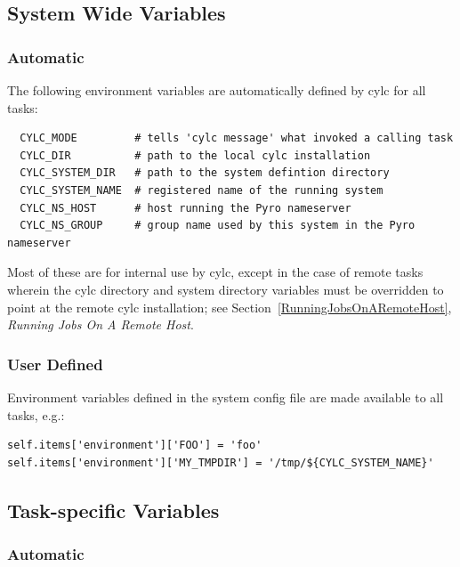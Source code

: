 \documentclass[11pt,a4paper]{article}
\begin{document}
\subsection{System Wide Variables}
\lstset{language=bash}

\subsubsection{Automatic}
The following environment variables are automatically defined by cylc
for all tasks:

\begin{lstlisting}
  CYLC_MODE         # tells 'cylc message' what invoked a calling task
  CYLC_DIR          # path to the local cylc installation
  CYLC_SYSTEM_DIR   # path to the system defintion directory
  CYLC_SYSTEM_NAME  # registered name of the running system 
  CYLC_NS_HOST      # host running the Pyro nameserver
  CYLC_NS_GROUP     # group name used by this system in the Pyro nameserver
\end{lstlisting}

Most of these are for internal use by cylc, except in the case of remote
tasks wherein the cylc directory and system directory variables must be
overridden to point at the remote cylc installation; see
Section~\ref{RunningJobsOnARemoteHost}, {\em Running
Jobs On A Remote Host}. 

\subsubsection{User Defined}
\label{SystemWideVariables}

Environment variables defined in the system config file are made
available to all tasks, e.g.: 

\lstset{language=Python}

\begin{lstlisting}
self.items['environment']['FOO'] = 'foo'
self.items['environment']['MY_TMPDIR'] = '/tmp/${CYLC_SYSTEM_NAME}'
\end{lstlisting}


\subsection{Task-specific Variables}
\lstset{language=bash}

\subsubsection{Automatic}
\end{document}
